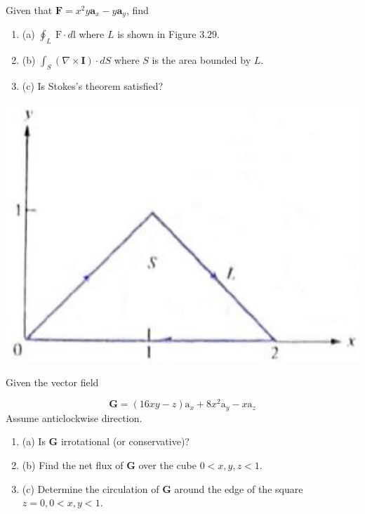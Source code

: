 \begin{problema}
    Given that $\mathbf{F}=x^{2} y \mathbf{a}_{x}-y \mathbf{a}_{y}$, find

    \begin{enumerate}
        \item (a) $\oint_{L} \mathrm{~F} \cdot d \mathrm{l}$ where $L$ is shown in Figure $3.29$.

        \item (b) $\int_{S}(\nabla \times \mathbf{I}) \cdot d S$ where $S$ is the area bounded by $L$.
        
        \item (c) Is Stokes's theorem satisfied?
    \end{enumerate}



\begin{center}
\includegraphics[scale=0.4]{Problemas/2023_02_02_45325701d3410451223eg-5}
\end{center}
\end{problema}

\begin{problema}

Given the vector field

$$
\mathbf{G}=(16 x y-z) \mathrm{a}_{x}+8 x^{2} \mathrm{a}_{y}-x \mathrm{a}_{z}
$$
Assume anticlockwise direction.

\begin{enumerate}
    \item (a) Is $\mathbf{G}$ irrotational (or conservative)?

    \item (b) Find the net flux of $\mathbf{G}$ over the cube $0<x, y, z<1$.
    
    \item (c) Determine the circulation of $\mathbf{G}$ around the edge of the square $z=0,0<x, y<1$.
\end{enumerate}



\end{problema}
%
%


